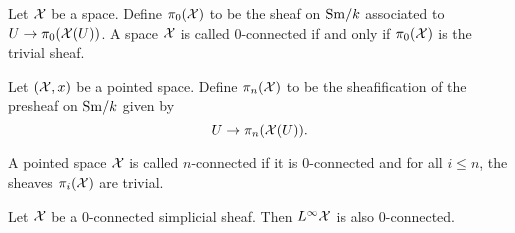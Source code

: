 \documentclass{amsart}%
\begin{document}





\begin{definition}
  Let $\mathcal{X}$ be a space. Define $\pi_0(\mathcal{X})$ to be the
  sheaf on $\mathrm{Sm}/k$ associated to $U \to \pi_0(\mathcal{X}(U))$. A space
  $\mathcal{X}$ is called $0$-connected if and only if
  $\pi_0(\mathcal{X})$ is the trivial sheaf. 

  Let $(\mathcal{X},x)$ be a pointed space. Define
  $\pi_n(\mathcal{X})$ to be the sheafification of the presheaf
  on $\mathrm{Sm}/k$ given by
  \begin{equation*}
    U \to \pi_n(\mathcal{X}(U)).
  \end{equation*}

  A pointed space $\mathcal{X}$ is called $n$-connected if it is
  $0$-connected and for all $i\leq n$, the sheaves
  $\pi_i(\mathcal{X})$ are trivial.
\end{definition}

\begin{proposition}
  Let $\mathcal{X}$ be a $0$-connected simplicial sheaf. Then
  $L^{\infty}\mathcal{X}$ is also $0$-connected.
\end{proposition}
\end{document}

